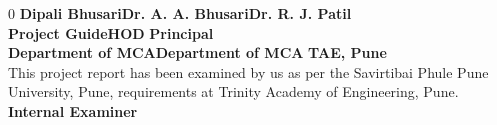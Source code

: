 \begin{spacing}{0}
\vspace*{1.2cm}
\hspace*{0.3in}\large{\textbf{Dipali Bhusari}}\hspace {1.1in}\large{\textbf{Dr. A. A. Bhusari}}\hspace*{1 in}\large{\textbf{Dr. R. J. Patil}}\\[.1cm]
\hspace*{0.4in}\textbf{Project Guide}\hspace*{1.8in}\textbf{HOD} \hspace*{1.5in}\textbf{Principal}\\
\hspace*{0.1 in}\textbf{Department of MCA}\hspace*{.8in}\textbf{Department of MCA} \hspace*{.9in}\textbf{TAE, Pune}\\[1 cm]
This project report has been examined by us as per the Savirtibai Phule Pune University, Pune,
requirements at Trinity Academy of Engineering, Pune.
\\[2 cm]
\hspace*{0.5in}\textbf{Internal Examiner} \hspace*{2.6in}
\end{spacing}

